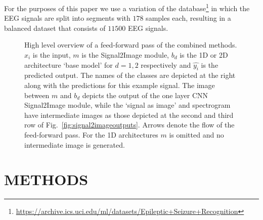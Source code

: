 \documentclass[conference]{IEEEtran}
\providecommand{\FILEPATH}{~/github.com/pbizopoulos/signal2image-modules-in-deep-neural-networks-for-eeg-classification/packages/default/tmp}
\begin{document}
For the purposes of this paper we use a variation of the database\footnote{\url{https://archive.ics.uci.edu/ml/datasets/Epileptic+Seizure+Recognition}} in which the EEG signals are split into segments with $178$ samples each, resulting in a balanced dataset that consists of $11500$ EEG signals.

\begin{figure}[!t]
  \centering
  \caption{High level overview of a feed-forward pass of the combined methods.
    $x_i$ is the input, $m$ is the Signal2Image module, $b_{d}$ is the 1D or 2D architecture `base model' for $d=1,2$ respectively and $\hat{y_i}$ is the predicted output.
    The names of the classes are depicted at the right along with the predictions for this example signal.
    The image between $m$ and $b_{d}$ depicts the output of the one layer CNN Signal2Image module, while the `signal as image' and spectrogram have intermediate images as those depicted at the second and third row of Fig.~\ref{fig:signal2imageoutputs}.
    Arrows denote the flow of the feed-forward pass.
  For the 1D architectures $m$ is omitted and no intermediate image is generated.}\label{fig:highleveloverview}
\end{figure}

\section{METHODS}
\end{document}
